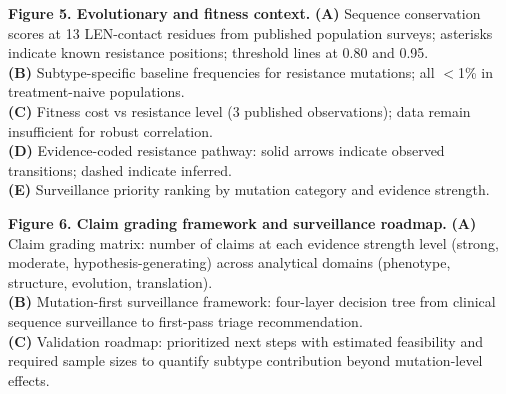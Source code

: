 \documentclass[12pt,a4paper]{article}
\begin{document}
\textbf{Figure 5. Evolutionary and fitness context.}
\textbf{(A)} Sequence conservation scores at 13 LEN-contact residues from published population surveys; asterisks indicate known resistance positions; threshold lines at 0.80 and 0.95.\\
\textbf{(B)} Subtype-specific baseline frequencies for resistance mutations; all $<$1\% in treatment-naive populations.\\
\textbf{(C)} Fitness cost vs resistance level (3 published observations); data remain insufficient for robust correlation.\\
\textbf{(D)} Evidence-coded resistance pathway: solid arrows indicate observed transitions; dashed indicate inferred.\\
\textbf{(E)} Surveillance priority ranking by mutation category and evidence strength.

\textbf{Figure 6. Claim grading framework and surveillance roadmap.}
\textbf{(A)} Claim grading matrix: number of claims at each evidence strength level (strong, moderate, hypothesis-generating) across analytical domains (phenotype, structure, evolution, translation).\\
\textbf{(B)} Mutation-first surveillance framework: four-layer decision tree from clinical sequence surveillance to first-pass triage recommendation.\\
\textbf{(C)} Validation roadmap: prioritized next steps with estimated feasibility and required sample sizes to quantify subtype contribution beyond mutation-level effects.
\end{document}
